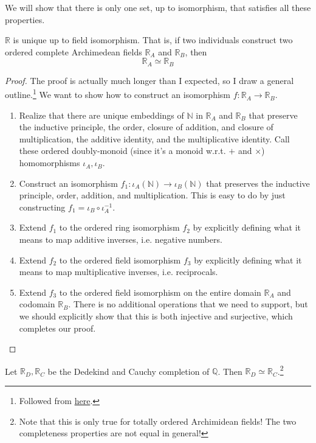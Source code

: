   We will show that there is only one set, up to isomorphism, that satisfies all these properties. 

  \begin{theorem}[Uniqueness]
    $\mathbb{R}$ is unique up to field isomorphism. That is, if two individuals construct two ordered complete Archimedean fields $\mathbb{R}_A$ and $\mathbb{R}_B$, then 
    \begin{equation}
      \mathbb{R}_A \simeq \mathbb{R}_B
    \end{equation}
  \end{theorem}  
  \begin{proof}
    The proof is actually much longer than I expected, so I draw a general outline.\footnote{Followed from \href{https://math.ucr.edu/~res/math205A/uniqreals.pdf}{here}.} We want to show how to construct an isomorphism $f: \mathbb{R}_A \rightarrow \mathbb{R}_B$. 
    \begin{enumerate}
      \item Realize that there are unique embeddings of $\mathbb{N}$ in $\mathbb{R}_A$ and $\mathbb{R}_B$ that preserve the inductive principle, the order, closure of addition, and closure of multiplication, the additive identity, and the multiplicative identity. Call these ordered doubly-monoid (since it's a monoid w.r.t. $+$ and $\times$) homomorphisms $\iota_A, \iota_B$. 
      \item Construct an isomorphism $f_1: \iota_A(\mathbb{N}) \rightarrow \iota_B(\mathbb{N})$ that preserves the inductive principle, order, addition, and multiplication. This is easy to do by just constructing $f_1 = \iota_B \circ \iota_A^{-1}$. 
      \item Extend $f_1$ to the ordered ring isomorphism $f_2$ by explicitly defining what it means to map additive inverses, i.e. negative numbers. 
      \item Extend $f_2$ to the ordered field isomorphism $f_3$ by explicitly defining what it means to map multiplicative inverses, i.e. reciprocals. 
      \item Extend $f_3$ to the ordered field isomorphism on the entire domain $\mathbb{R}_A$ and codomain $\mathbb{R}_B$. There is no additional operations that we need to support, but we should explicitly show that this is both injective and surjective, which completes our proof. 
    \end{enumerate}
  \end{proof}

  \begin{corollary}
    Let $\mathbb{R}_D, \mathbb{R}_C$ be the Dedekind and Cauchy completion of $\mathbb{Q}$. Then $\mathbb{R}_D \simeq \mathbb{R}_C$.\footnote{Note that this is only true for totally ordered Archimidean fields! The two completeness properties are not equal in general!}
  \end{corollary}

